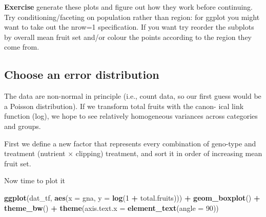 \documentclass[
  12pt,
]{book}
\newenvironment{Shaded}{\begin{snugshade}}{\end{snugshade}}
\newcommand{\DataTypeTok}[1]{\textcolor[rgb]{0.13,0.29,0.53}{#1}}
\newcommand{\DecValTok}[1]{\textcolor[rgb]{0.00,0.00,0.81}{#1}}
\newcommand{\KeywordTok}[1]{\textcolor[rgb]{0.13,0.29,0.53}{\textbf{#1}}}
\newcommand{\NormalTok}[1]{#1}
\newcommand{\OperatorTok}[1]{\textcolor[rgb]{0.81,0.36,0.00}{\textbf{#1}}}
\newcommand{\StringTok}[1]{\textcolor[rgb]{0.31,0.60,0.02}{#1}}
\begin{document}
\textbf{Exercise} generate these plots and figure out how they work before continuing. Try conditioning/faceting on population rather than region: for ggplot you might want to take out the nrow=1 specification. If you want try reorder the subplots by overall mean fruit set and/or colour the points according to the region they come from.

\hypertarget{choose-an-error-distribution}{%
\subsection{Choose an error distribution}\label{choose-an-error-distribution}}

The data are non-normal in principle (i.e., count data, so our first guess would be a Poisson distribution). If we transform total fruits with the canon- ical link function (log), we hope to see relatively homogeneous variances across categories and groups.

First we define a new factor that represents every combination of geno-type and treatment (nutrient × clipping) treatment, and sort it in order of increasing mean fruit set.

\begin{Shaded}
\end{Shaded}

Now time to plot it

\begin{Shaded}
\begin{Highlighting}[]
\KeywordTok{ggplot}\NormalTok{(dat_tf, }\KeywordTok{aes}\NormalTok{(}\DataTypeTok{x =}\NormalTok{ gna, }\DataTypeTok{y =} \KeywordTok{log}\NormalTok{(}\DecValTok{1} \OperatorTok{+}\StringTok{ }\NormalTok{total.fruits))) }\OperatorTok{+}
\StringTok{  }\KeywordTok{geom_boxplot}\NormalTok{() }\OperatorTok{+}
\StringTok{  }\KeywordTok{theme_bw}\NormalTok{() }\OperatorTok{+}
\StringTok{  }\KeywordTok{theme}\NormalTok{(}\DataTypeTok{axis.text.x =} \KeywordTok{element_text}\NormalTok{(}\DataTypeTok{angle =} \DecValTok{90}\NormalTok{))}
\end{Highlighting}
\end{Shaded}
\end{document}
